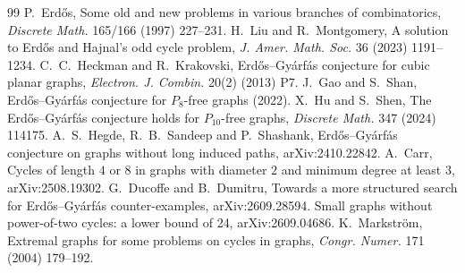 \documentclass[11pt]{article}
\theoremstyle{remark}
\begin{document}
\begin{thebibliography}{99}
 P.~Erd\H{o}s, Some old and new problems in various branches of combinatorics,
  \emph{Discrete Math.} 165/166 (1997) 227--231.
 H.~Liu and R.~Montgomery, A solution to Erd\H{o}s and Hajnal's odd cycle
  problem, \emph{J. Amer. Math. Soc.} 36 (2023) 1191--1234.
 C.~C.~Heckman and R.~Krakovski, Erd\H{o}s--Gy\'arf\'as conjecture for cubic planar
  graphs, \emph{Electron. J. Combin.} 20(2) (2013) P7.
 J.~Gao and S.~Shan, Erd\H{o}s--Gy\'arf\'as conjecture for $P_8$-free graphs (2022).
 X.~Hu and S.~Shen, The Erd\H{o}s--Gy\'arf\'as conjecture holds for $P_{10}$-free
  graphs, \emph{Discrete Math.} 347 (2024) 114175.
 A.~S.~Hegde, R.~B.~Sandeep and P.~Shashank, Erd\H{o}s--Gy\'arf\'as conjecture on graphs
  without long induced paths, arXiv:2410.22842.
 A.~Carr, Cycles of length $4$ or $8$ in graphs with diameter $2$ and minimum degree at
  least $3$, arXiv:2508.19302.
 G.~Ducoffe and B.~Dumitru, Towards a more structured search for Erd\H{o}s--Gy\'arf\'as
  counter-examples, arXiv:2609.28594.
 Small graphs without power-of-two cycles: a lower bound of 24, arXiv:2609.04686.
 K.~Markstr\"om, Extremal graphs for some problems on cycles in graphs,
  \emph{Congr. Numer.} 171 (2004) 179--192.
\end{thebibliography}
\end{document}
